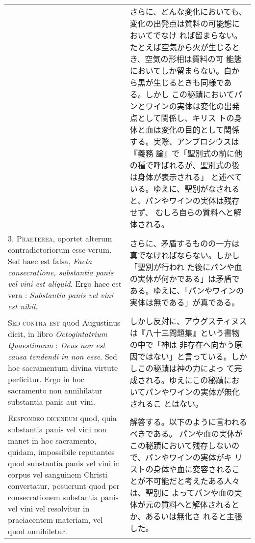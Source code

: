 \documentclass[10pt]{jsarticle} %
\begin{document}
\begin{longtable}{p{21em}p{21em}}
&


さらに、どんな変化においても、変化の出発点は質料の可能態においてでなけ
 れば留まらない。たとえば空気から火が生じるとき、空気の形相は質料の可
 能態においてしか留まらない。白から黒が生じるときも同様である。しかし
 この秘蹟においてパンとワインの実体は変化の出発点として関係し、キリス
 トの身体と血は変化の目的として関係する。実際、アンブロシウスは『義務
 論』で「聖別式の前に他の種で呼ばれるが、聖別式の後は身体が表示される」
 と述べている。ゆえに、聖別がなされると、パンやワインの実体は残存せず、
 むしろ自らの質料へと解体される。

\\



3. {\scshape Praeterea}, oportet alterum contradictoriorum esse verum. Sed haec est
falsa, {\itshape Facta consecratione, substantia panis vel vini est
aliquid}. Ergo haec est vera : {\itshape Substantia panis vel vini est nihil}.

&

さらに、矛盾するものの一方は真でなければならない。しかし「聖別が行われ
た後にパンや血の実体が何かである」は矛盾である。ゆえに、「パンやワインの
 実体は無である」が真である。

\\



{\scshape Sed contra est} quod Augustinus dicit, in libro {\itshape Octogintatrium
Quaestionum} : {\itshape Deus non est causa tendendi in non esse}. Sed hoc
sacramentum divina virtute perficitur. Ergo in hoc sacramento non
annihilatur substantia panis aut vini.

&

しかし反対に、アウグスティヌスは『八十三問題集』という書物の中で「神は
 非存在へ向かう原因ではない」と言っている。しかしこの秘蹟は神の力によっ
 て完成される。ゆえにこの秘蹟においてパンやワインの実体が無化されるこ
 とはない。


\\



{\scshape Respondeo dicendum} quod, quia substantia panis vel vini non manet in
hoc sacramento, quidam, impossibile reputantes quod substantia panis
vel vini in corpus vel sanguinem Christi convertatur, posuerunt quod
per consecrationem substantia panis vel vini vel resolvitur in
praeiacentem materiam, vel quod annihiletur. 


&

解答する。以下のように言われるべきである。
パンや血の実体がこの秘蹟において残存しないので、パンやワインの実体がキ
 リストの身体や血に変容されることが不可能だと考えたある人々は、聖別に
 よってパンや血の実体が元の質料へと解体されるとか、あるいは無化さ
 れると主張した。


\end{longtable}
\end{document}
